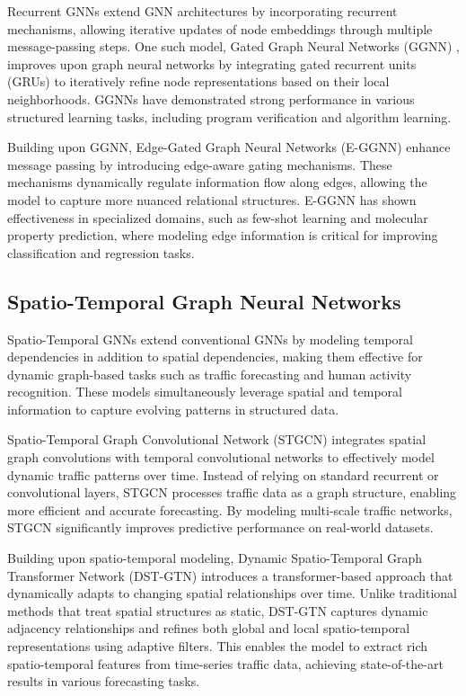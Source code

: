 \documentclass[journal]{IEEEtran}
\begin{document}
Recurrent GNNs extend GNN architectures by incorporating recurrent mechanisms, allowing iterative updates of node embeddings through multiple message-passing steps. One such model, Gated Graph Neural Networks (GGNN) \cite{li2015gated}, improves upon graph neural networks by integrating gated recurrent units (GRUs) to iteratively refine node representations based on their local neighborhoods. GGNNs have demonstrated strong performance in various structured learning tasks, including program verification and algorithm learning.

Building upon GGNN, Edge-Gated Graph Neural Networks (E-GGNN) \cite{zheng2024edge} enhance message passing by introducing edge-aware gating mechanisms. These mechanisms dynamically regulate information flow along edges, allowing the model to capture more nuanced relational structures. E-GGNN has shown effectiveness in specialized domains, such as few-shot learning and molecular property prediction, where modeling edge information is critical for improving classification and regression tasks.


\subsection{Spatio-Temporal Graph Neural Networks}

Spatio-Temporal GNNs extend conventional GNNs by modeling temporal dependencies in addition to spatial dependencies, making them effective for dynamic graph-based tasks such as traffic forecasting and human activity recognition. These models simultaneously leverage spatial and temporal information to capture evolving patterns in structured data.

Spatio-Temporal Graph Convolutional Network (STGCN) \cite{yu2017spatio} integrates spatial graph convolutions with temporal convolutional networks to effectively model dynamic traffic patterns over time. Instead of relying on standard recurrent or convolutional layers, STGCN processes traffic data as a graph structure, enabling more efficient and accurate forecasting. By modeling multi-scale traffic networks, STGCN significantly improves predictive performance on real-world datasets.

Building upon spatio-temporal modeling, Dynamic Spatio-Temporal Graph Transformer Network (DST-GTN) \cite{huang2024dst} introduces a transformer-based approach that dynamically adapts to changing spatial relationships over time. Unlike traditional methods that treat spatial structures as static, DST-GTN captures dynamic adjacency relationships and refines both global and local spatio-temporal representations using adaptive filters. This enables the model to extract rich spatio-temporal features from time-series traffic data, achieving state-of-the-art results in various forecasting tasks.
\end{document}
